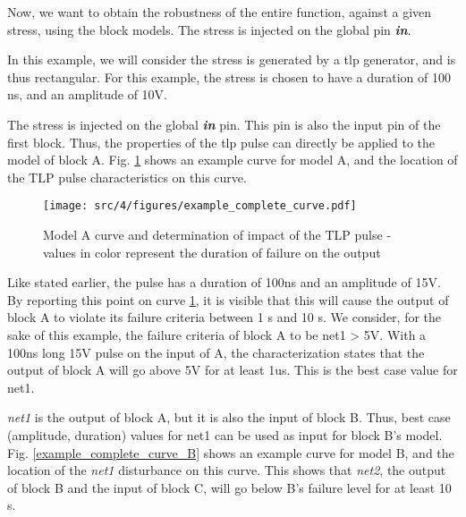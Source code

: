 Now, we want to obtain the robustness of the entire function, against a given stress, using the block models.
The stress is injected on the global pin \textbf{\textit{in}}.

In this example, we will consider the stress is generated by a \gls{tlp} generator, and is thus rectangular.
For this example, the stress is chosen to have a duration of 100 ns, and an amplitude of 10V.

The stress is injected on the global \textbf{\textit{in}} pin.
This pin is also the input pin of the first block.
Thus, the properties of the \gls{tlp} pulse can directly be applied to the model of block A.
Fig. \ref{example_complete_curve} shows an example curve for model A, and the location of the TLP pulse characteristics on this curve.

\begin{figure}[!h]
  \centering
  \texttt{[image: src/4/figures/example\_complete\_curve.pdf]}
  \caption{Model A curve and determination of impact of the TLP pulse - values in color represent the duration of failure on the output}
  \label{example_complete_curve}
\end{figure}

Like stated earlier, the pulse has a duration of 100ns and an amplitude of 15V. By reporting this point on curve \ref{example_complete_curve},
it is visible that this will cause the output of block A to violate its failure criteria between 1 \textmugreek{}s and 10 \textmugreek{}s.
We consider, for the sake of this example, the failure criteria of block A to be net1 > 5V.
With a 100ns long 15V pulse on the input of A, the characterization states that the output of block A will go above 5V for at least 1us.
This is the best case value for net1.

\textit{net1} is the output of block A, but it is also the input of block B.
Thus, best case (amplitude, duration) values for net1 can be used as input for block B's model.
Fig. \ref{example_complete_curve_B} shows an example curve for model B, and the location of the \textit{net1} disturbance on this curve.
This shows that \textit{net2}, the output of block B and the input of block C, will go below B's failure level for at least 10 \textmugreek{}s.

